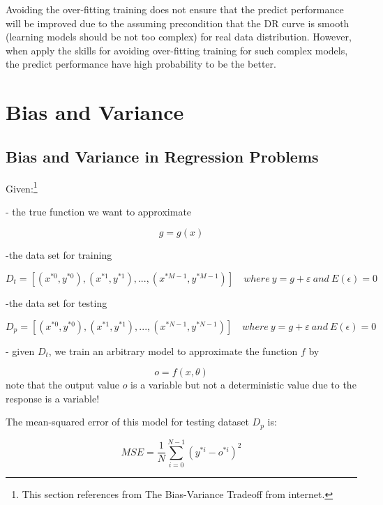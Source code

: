 \documentclass[runningheads,openany]{xhlPaper}
\begin{document}
Avoiding the over-fitting training does not ensure that the predict performance will be improved due to the assuming precondition that the DR curve is smooth  (learning models should be not too complex) for real data distribution. However, when apply the skills for avoiding over-fitting training for such complex models, the predict performance have high probability to be the better.

\section{Bias and Variance}
\subsection{Bias and Variance in Regression Problems}
Given:\footnote{This section references from The Bias-Variance Tradeoff from internet.}

- the true function we want to approximate

\begin{displaymath}
g=g\left(x\right)
\end{displaymath}

-the data set for training

\begin{displaymath}
D_t=\left[\left(x^{*0},y^{*0}\right),\left(x^{*1},y^{*1}\right),...,\left(x^{*M-1},y^{*M-1}\right)\right]\quad where\ y = g + \varepsilon\ and\ E\left(\epsilon\right)=0
\end{displaymath}

-the data set for testing

\begin{displaymath}
D_p=\left[\left(x^{*0},y^{*0}\right),\left(x^{*1},y^{*1}\right),...,\left(x^{*N-1},y^{*N-1}\right)\right]\quad where\ y = g + \varepsilon\ and\ E\left(\epsilon\right)=0
\end{displaymath}

- given ${D_t}$, we train an arbitrary model to approximate the function $f$ by

\begin{displaymath}
o=f\left(x,\theta\right)
\end{displaymath}
note that the output value ${o}$ is a variable but not a deterministic value due to the response is a variable!

The mean-squared error of this model for testing dataset ${D_p}$ is:

\begin{displaymath}
MSE=\frac{1}{N}{\sum_{i=0}^{N-1}\left ( y^{*i}-o^{*i} \right )^2}
\end{displaymath}
\end{document}
